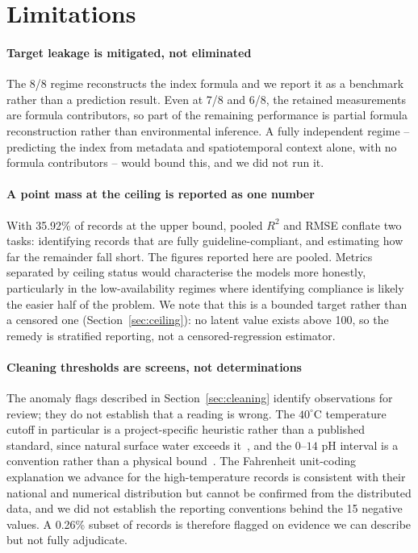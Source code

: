 \section{Limitations}
\label{sec:limitations}

\paragraph{Target leakage is mitigated, not eliminated}
The 8/8 regime reconstructs the index formula and we report it as a benchmark rather
than a prediction result. Even at 7/8 and 6/8, the retained measurements are formula
contributors, so part of the remaining performance is partial formula reconstruction
rather than environmental inference. A fully independent regime -- predicting the index
from metadata and spatiotemporal context alone, with no formula contributors -- would
bound this, and we did not run it.

\paragraph{A point mass at the ceiling is reported as one number}
With 35.92\% of records at the upper bound, pooled $R^2$ and RMSE conflate two tasks:
identifying records that are fully guideline-compliant, and estimating how far the
remainder fall short. The figures reported here are pooled. Metrics separated by ceiling
status would characterise the models more honestly, particularly in the low-availability
regimes where identifying compliance is likely the easier half of the problem. We note
that this is a bounded target rather than a censored one
(Section~\ref{sec:ceiling}): no latent value exists above 100, so the remedy is
stratified reporting, not a censored-regression estimator.

\paragraph{Cleaning thresholds are screens, not determinations}
The anomaly flags described in Section~\ref{sec:cleaning} identify observations for
review; they do not establish that a reading is wrong. The $40^\circ$C temperature cutoff
in particular is a project-specific heuristic rather than a published standard, since
natural surface water exceeds it~\cite{farrar2007hotcreek}, and the $0$--$14$ pH interval
is a convention rather than a physical bound~\cite{nordstrom2000negativeph}. The
Fahrenheit unit-coding explanation we advance for the high-temperature records is
consistent with their national and numerical distribution but cannot be confirmed from the
distributed data, and we did not establish the reporting conventions behind the 15 negative
values. A 0.26\% subset of records is therefore flagged on evidence we can describe but
not fully adjudicate.

